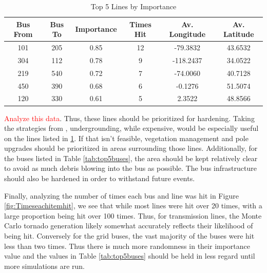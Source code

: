 \documentclass[12pt]{article}
\begin{document}
\begin{table}[ht]
    \centering
    \begin{tabular}{cccccc}
        \toprule
        Bus From & Bus To & Importance & Times Hit & Av. Longitude & Av. Latitude \\
        \midrule
        101 & 205 & 0.85 & 12 & -79.3832 & 43.6532 \\
        304 & 112 & 0.78 & 9  & -118.2437 & 34.0522 \\
        219 & 540 & 0.72 & 7  & -74.0060 & 40.7128 \\
        450 & 390 & 0.68 & 6  & -0.1276 & 51.5074 \\
        120 & 330 & 0.61 & 5  & 2.3522 & 48.8566 \\
        \bottomrule
    \end{tabular}
    \caption{Top 5 Lines by Importance}
    \label{tab:top5lines}
\end{table}

\textcolor{red}{Analyze this data}. Thus, these lines should be prioritized for hardening. Taking the strategies from \cite{hughes2024assessing}, undergrounding, while expensive, would be especially useful on the lines listed in \ref{tab:top5lines}. If that isn't feasible, vegetation management and pole upgrades should be prioritized in areas surrounding those lines. Additionally, for the buses listed in Table \ref{tab:top5buses}, the area should be kept relatively clear to avoid as much debris blowing into the bus as possible. The bus infrastructure should also be hardened in order to withstand future events. 


Finally, analyzing the number of times each bus and line was hit in Figure \ref{fig:Timeseachitemhit}, we see that while most lines were hit over 20 times, with a large proportion being hit over 100 times. Thus, for transmission lines, the Monte Carlo tornado generation likely somewhat accurately reflects their likelihood of being hit. Conversely for the grid buses, the vast majority of the buses were hit less than two times. Thus there is much more randomness in their importance value and the values in Table \ref{tab:top5buses} should be held in less regard until more simulations are run.
\end{document}
